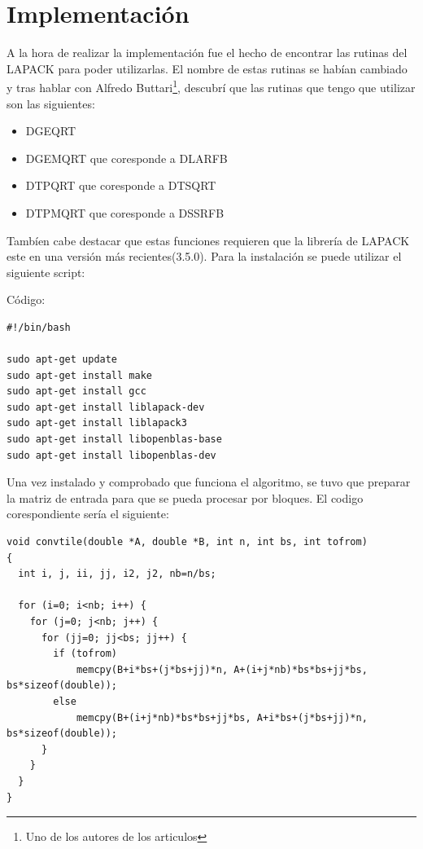 \documentclass[12pt]{article}
\begin{document}
\clearpage

\section{Implementación}
\label{sec:impl}

A la hora de realizar la implementación fue el hecho de encontrar las rutinas del LAPACK para poder utilizarlas. El nombre de estas rutinas se habían cambiado y tras hablar con Alfredo Buttari\footnote{Uno de los autores de los articulos}, descubrí que las rutinas que tengo que utilizar son las siguientes:

\begin{itemize}
  \item DGEQRT
  \item DGEMQRT que coresponde a DLARFB
  \item DTPQRT que coresponde a DTSQRT
  \item DTPMQRT que coresponde a DSSRFB
\end{itemize}

Tambíen cabe destacar que estas funciones requieren que la librería de LAPACK este en una versión más recientes(3.5.0). Para la instalación se puede utilizar el siguiente script:

Código:
\begin{lstlisting}[basicstyle=\ttfamily\tiny]
%\begin{lstlisting}[basicstyle=\ttfamily]
#!/bin/bash

sudo apt-get update
sudo apt-get install make
sudo apt-get install gcc
sudo apt-get install liblapack-dev
sudo apt-get install liblapack3
sudo apt-get install libopenblas-base
sudo apt-get install libopenblas-dev
\end{lstlisting}

Una vez instalado y comprobado que funciona el algoritmo, se tuvo que preparar la matriz de entrada para que se pueda procesar por bloques. El codigo corespondiente sería el siguiente:

\begin{lstlisting}[basicstyle=\ttfamily\tiny]
void convtile(double *A, double *B, int n, int bs, int tofrom)
{
  int i, j, ii, jj, i2, j2, nb=n/bs;

  for (i=0; i<nb; i++) {
    for (j=0; j<nb; j++) {
      for (jj=0; jj<bs; jj++) {
        if (tofrom) 
        	memcpy(B+i*bs+(j*bs+jj)*n, A+(i+j*nb)*bs*bs+jj*bs, bs*sizeof(double));
        else 
        	memcpy(B+(i+j*nb)*bs*bs+jj*bs, A+i*bs+(j*bs+jj)*n, bs*sizeof(double));
      }
    }
  }
}
\end{lstlisting}
\end{document}
